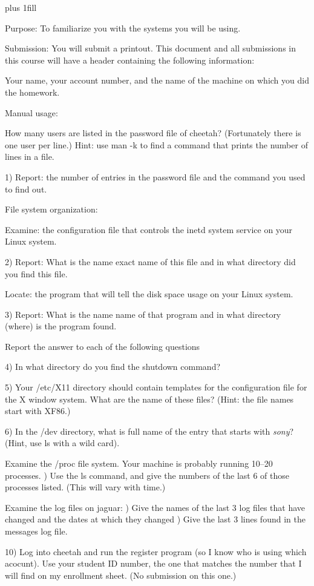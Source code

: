 
\rightskip=0pt plus 1fill

\parindent 0pt

Purpose:
To familiarize you with the systems you will be using.

Submission: You will submit a printout.
This document and all submissions in this course will have a header
containing the following information:

Your name, your account number, and the name of the machine on which you
did the homework.

Manual usage:

How many users are listed in the password file of cheetah?
(Fortunately there is one user per line.)
Hint: use {\ltt{}man -k} to find a command that prints the number
of lines in a file.

1) Report: the number of entries in the password file and
the command you used to find out.

File system organization:

Examine: the configuration file that controls the {\ltt{}inetd} system service
on your Linux system.

2) Report: What is the name exact name of this file
and in what directory did you find this file.

Locate: the program that will tell the disk space usage
on your Linux system.

3) Report: What is the name name of that program 
and in what directory (where) is the program found.

Report the answer to each of the following questions

4) In what directory do you find the {\ltt{}shutdown} command?

5) Your {\ltt{}/etc/X11} directory should contain templates for
the configuration file for the {\ltt{}X} window system.
What are the name of these files?
(Hint: the file names start with XF86.)

6) In the {\ltt{}/dev} directory, what is full name of the entry that starts
with {\it sony}? (Hint, use ls with a wild card).

Examine the {\ltt{}/proc} file system.
Your machine is probably running 10--20 processes.
\hfill{}) Use the {\ltt{}ls} command, and give the numbers of the last 6
of those processes listed. (This will vary with time.)

Examine the log files on {\ltt{}jaguar}:
\hfill{}) Give the names of the last 3 log files that have changed and 
the dates at which they changed
\hfill{}) Give the last 3 lines found in the {\ltt{}messages} log file.

10) Log into {\ltt{}cheetah} and run the {\ltt{}register} program
(so I know who is using
which acocunt). Use your student ID number, the one that matches
the number that I will find on my enrollment sheet.
(No submission on this one.)

\bye
